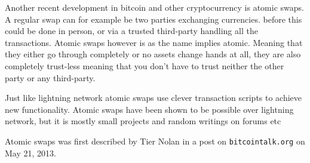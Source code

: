 
Another recent development in bitcoin and other cryptocurrency is atomic swaps.
A regular swap can for example be two parties exchanging currencies. before
this could be done in person, or via a trusted third-party handling all the
transactions. Atomic swaps however is as the name implies atomic. Meaning that
they either go through completely or no assets change hands at all, they are
also completely trust-less meaning that you don't have to trust neither the
other party or any third-party.

Just like lightning network atomic swaps use clever transaction scripts to
achieve new functionality. Atomic swaps have been shown to be possible over
lightning network, but it is mostly small projects and random writings on
forums etc

Atomic swaps was first described by Tier Nolan in a post on
\texttt{bitcointalk.org} on May 21, 2013.\cite{tier_nolan}
